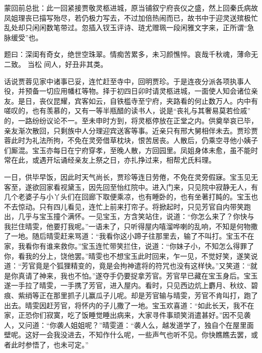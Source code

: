 

\begin{parag}
    \begin{note}蒙回前总批：此一回紧接贾敬灵柩进城，原当铺叙宁府丧仪之盛，然上回秦氏病故凤姐理丧已描写殆尽，若仍极力写去，不过加倍热闹而已，故书中于迎灵送殡极忙乱处却只闲闲数笔带过。忽插入钗玉评诗、琏尤赠珮一段闲雅文字来，正所谓“急脉缓受”也。\end{note}
\end{parag}


\begin{parag}
    \begin{note}题曰：深闺有奇女，绝世空珠翠。情痴苦累多，未习颜憔悴。哀哉千秋魂，薄命无二致。 当松 间人，好丑非其类。\end{note}
\end{parag}



\begin{parag}
    话说贾蓉见家中诸事已妥，连忙赶至寺中，回明贾珍。于是连夜分派各项执事人役，并预备一切应用幡杠等物。择于初四日卯时请灵柩进城，一面使人知会诸位亲友。是日，丧仪昆耀，宾客如云，自铁槛寺至宁府，夹路看的何止数万人。内中有嗟叹的，也有羡慕的，又有一等半瓶醋的读书人，说是“丧礼与其奢易莫若俭戚” 的，一路纷纷议论不一。至未申时方到，将灵柩停放在正堂之内。供奠举哀已毕，亲友渐次散回，只剩族中人分理迎宾送客等事。近亲只有邢大舅相伴未去。贾珍贾蓉此时为礼法所拘，不免在灵旁借草枕块，恨苦居丧。人散后，仍乘空寻他小姨子们厮混。宝玉亦每日在宁府穿孝，至晚人散，方回园里。凤姐身体未愈，虽不能时常在此，或遇开坛诵经亲友上祭之日，亦扎挣过来，相帮尤氏料理。
\end{parag}


\begin{parag}
    一日，供毕早饭，因此时天气尚长，贾珍等连日劳倦，不免在灵旁假寐。宝玉见无客至，遂欲回家看视黛玉，因先回至怡红院中。进入门来，只见院中寂静无人，有几个老婆子与小丫头们在回廊下取便乘凉，也有睡卧的，也有坐著打盹的。宝玉也不去惊动。只有四儿看见，连忙上前来打帘子。将掀起时，只见芳官自内带笑跑出，几乎与宝玉撞个满怀。一见宝玉，方含笑站住，说道：“你怎么来了？你快与我拦住晴雯，他要打我呢。”一语未了，只听得屋内嘻溜哗喇的乱响，不知是何物撒了一地。随后晴雯赶来骂道：“我看你这小蹄子往那里去，输了不叫打。宝玉不在家，我看你有谁来救你。”宝玉连忙带笑拦住，说道：“你妹子小，不知怎么得罪了你，看我的分上，饶他罢。”晴雯也不想宝玉此时回来，乍一见，不觉好笑，遂笑说道：“芳官竟是个狐狸精变的，竟是会拘神遣将的符咒也没有这样快。”又笑道：“就是你真请了神来，我也不怕。”遂夺手仍要捉拿芳官。芳官早已藏在宝玉身后。宝玉遂一手拉了晴雯，一手携了芳官，进入屋内。看时，只见西边炕上麝月、秋纹、碧痕、紫绡等正在那里抓子儿赢瓜子儿呢。却是芳官输与晴雯，芳官不肯叫打，跑了出去。晴雯因赶芳官，将怀内的子儿撒了一地。宝玉欢喜道：“如此长天，我不在家，正恐你们寂寞，吃了饭睡觉睡出病来，大家寻件事顽笑消遣甚好。”因不见袭人，又问道：“你袭人姐姐呢？”晴雯道：“袭人么，越发道学了，独自个在屋里面壁呢。这好一会我没进去，不知作什么呢，一些声气也听不见。你快瞧瞧去罢，或者此时参悟了，也未可定。”
\end{parag}


